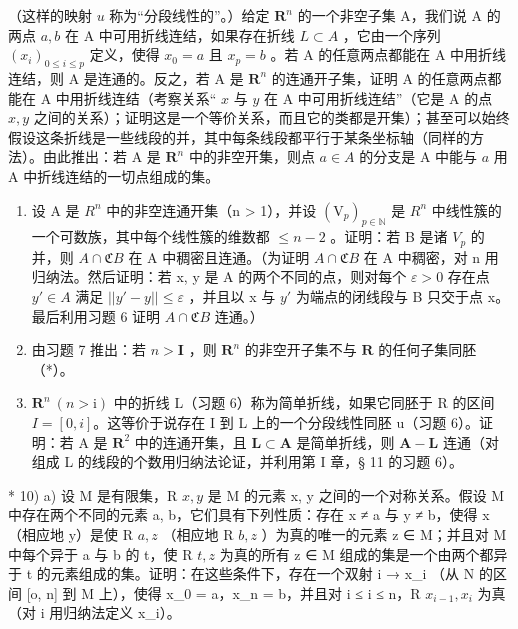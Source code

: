 （这样的映射 \(u\) 称为“分段线性的”。）给定 \(\mathbf{R}^n\) 的一个非空子集 A，我们说 A 的两点 \(a, b\) 在 A 中可用折线连结，如果存在折线 \(L \subset A\) ，它由一个序列 \((x_i)_{0 \leqslant i \leqslant p}\) 定义，使得 \(x_0 = a\) 且 \(x_p = b\) 。若 A 的任意两点都能在 A 中用折线连结，则 A 是连通的。反之，若 A 是 \(\mathbf{R}^n\) 的连通开子集，证明 A 的任意两点都能在 A 中用折线连结（考察关系“ \(x\) 与 \(y\) 在 A 中可用折线连结”（它是 A 的点 \(x, y\) 之间的关系）；证明这是一个等价关系，而且它的类都是开集）；甚至可以始终假设这条折线是一些线段的并，其中每条线段都平行于某条坐标轴（同样的方法）。由此推出：若 A 是 \(\mathbf{R}^n\) 中的非空开集，则点 \(a \in A\) 的分支是 A 中能与 \(a\) 用 A 中折线连结的一切点组成的集。

\begin{enumerate}
\def\labelenumi{\arabic{enumi})}
\setcounter{enumi}{6}
\item
  设 A 是 \(R^{n}\) 中的非空连通开集（n \textgreater{} 1），并设 \((\mathrm{V}_{p})_{p \in \mathbb{N}}\) 是 \(R^{n}\) 中线性簇的一个可数族，其中每个线性簇的维数都 \(\leqslant n - 2\) 。证明：若 B 是诸 \(V_{p}\) 的并，则 \(A \cap \mathfrak{C}B\) 在 A 中稠密且连通。（为证明 \(A \cap \mathfrak{C}B\) 在 A 中稠密，对 n 用归纳法。然后证明：若 x, y 是 A 的两个不同的点，则对每个 \(\varepsilon > 0\) 存在点 \(y' \in A\) 满足 \(||y' - y|| \leqslant \varepsilon\) ，并且以 x 与 \(y'\) 为端点的闭线段与 B 只交于点 x。最后利用习题 6 证明 \(A \cap \mathfrak{C}B\) 连通。）
\item
  由习题 7 推出：若 \(n > \mathbf{I}\) ，则 \(\mathbf{R}^n\) 的非空开子集不与 \(\mathbf{R}\) 的任何子集同胚（*）。
\item
  \(\mathbf{R}^{n}\ (n > \mathrm{i})\) 中的折线 L（习题 6）称为简单折线，如果它同胚于 R 的区间 \(I = [0, i]\)。这等价于说存在 I 到 L 上的一个分段线性同胚 u（习题 6）。证明：若 A 是 \(\mathbf{R}^2\) 中的连通开集，且 \(\mathbf{L}\subset\mathbf{A}\) 是简单折线，则 \(\mathbf{A}-\mathbf{L}\) 连通（对组成 L 的线段的个数用归纳法论证，并利用第 I 章，§ 11 的习题 6）。
\end{enumerate}

* 10) a) 设 M 是有限集，R \(x, y\) 是 M 的元素 x, y 之间的一个对称关系。假设 M 中存在两个不同的元素 a, b，它们具有下列性质：存在 x ≠ a 与 y ≠ b，使得 x（相应地 y）是使 R \(a, z\) （相应地 R \(b, z\) ）为真的唯一的元素 z ∈ M；并且对 M 中每个异于 a 与 b 的 t，使 R \(t, z\) 为真的所有 z ∈ M 组成的集是一个由两个都异于 t 的元素组成的集。证明：在这些条件下，存在一个双射 i → x\_i （从 N 的区间 {[}o, n{]} 到 M 上），使得 x\_0 = a，x\_n = b，并且对 i ≤ i ≤ n，R \(x_{i-1}, x_i\) 为真（对 i 用归纳法定义 x\_i）。

